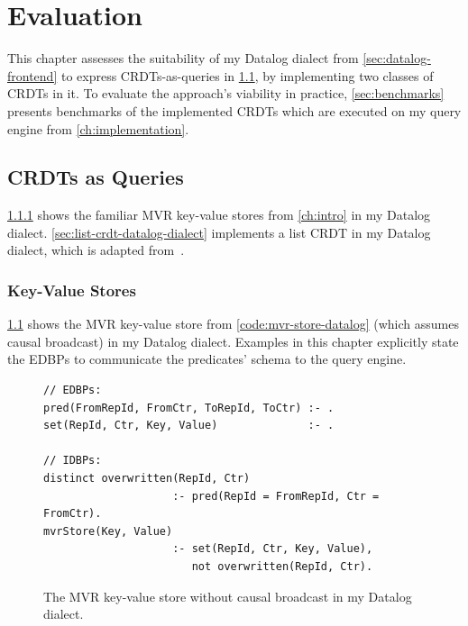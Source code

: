 
\chapter{Evaluation}\label{ch:evaluation}

This chapter assesses the suitability of my Datalog dialect from
\ref{sec:datalog-frontend} to express \acp{CRDT}-as-queries
in \ref{sec:crdts-as-queries}, by implementing two classes of \acp{CRDT} in it.
To evaluate the approach's viability in practice,
\ref{sec:benchmarks} presents benchmarks of the implemented \acp{CRDT}
which are executed on my query engine from \ref{ch:implementation}.

\section{\acsp{CRDT} as Queries}\label{sec:crdts-as-queries}

\ref{sec:key-value-stores-datalog-dialect} shows the familiar \ac{MVR} key-value
stores from \ref{ch:intro} in my Datalog dialect.
\ref{sec:list-crdt-datalog-dialect} implements a list \ac{CRDT} in my Datalog
dialect, which is adapted from~\cite{kleppmann2018data}.

\subsection{Key-Value Stores}\label{sec:key-value-stores-datalog-dialect}

\ref{code:mvr-store-datalog-dialect} shows the \ac{MVR} key-value store
from \ref{code:mvr-store-datalog} (which assumes causal broadcast)
in my Datalog dialect.
Examples in this chapter explicitly state the \acp{EDBP} to communicate the
predicates' schema to the query engine.

\begin{figure}[htpb]
    \begin{lstlisting}[keepspaces]
// EDBPs:
pred(FromRepId, FromCtr, ToRepId, ToCtr) :- .
set(RepId, Ctr, Key, Value)              :- .

// IDBPs:
distinct overwritten(RepId, Ctr)
                    :- pred(RepId = FromRepId, Ctr = FromCtr).
mvrStore(Key, Value)
                    :- set(RepId, Ctr, Key, Value),
                       not overwritten(RepId, Ctr).\end{lstlisting}
    \caption{
        The \ac{MVR} key-value store without causal broadcast in my Datalog
        dialect.
    }\label{code:mvr-store-datalog-dialect}
\end{figure}

